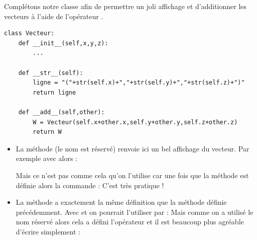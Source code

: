\documentclass[11pt,class=report,crop=false]{standalone}
\begin{document}
\begin{cours}


Complétons notre classe  afin de permettre un joli affichage  et d'additionner les vecteurs à l'aide de l'opérateur \og{}\ci{+}\fg{}.

\begin{lstlisting}
class Vecteur:
    def __init__(self,x,y,z):
        ...	
	
    def __str__(self):
        ligne = "("+str(self.x)+","+str(self.y)+","+str(self.z)+")"
        return ligne

    def __add__(self,other):
        W = Vecteur(self.x+other.x,self.y+other.y,self.z+other.z)
        return W
\end{lstlisting}

\begin{itemize}
  \item La méthode  (le nom est réservé) renvoie ici un bel affichage du vecteur.
  Par exemple avec  alors :  
  
  
  Mais ce n'est pas comme cela qu'on l'utilise car une fois que la méthode  est définie alors la commande :  
	C'est très pratique !
	
	
  \item La méthode  a exactement la même définition que la méthode  définie précédemment.
  Avec  et  on pourrait l'utiliser par :  
  Mais comme on a utilisé le nom réservé  alors cela a défini l'opérateur \og{}\ci{+}\fg{} et il est beaucoup plus agréable d'écrire simplement : 
  \end{itemize}

\end{cours}
\end{document}
